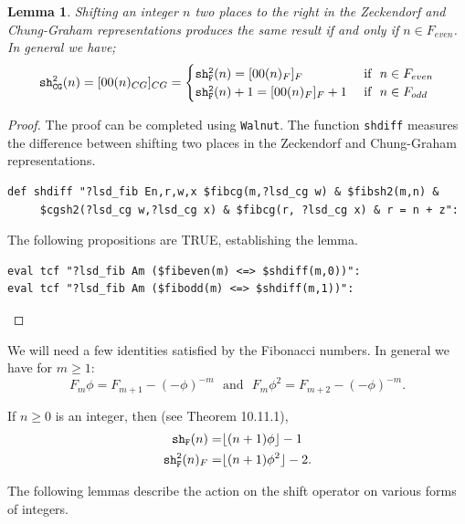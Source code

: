 \documentclass[12pt]{article}
\theoremstyle{plain}
\newtheorem{lemma}[theorem]{Lemma}
\theoremstyle{case}
\theoremstyle{definition}
\begin{document}
\begin{lemma}
\label{fibcgsh}
Shifting an integer $n$ two places to the right in the Zeckendorf and Chung-Graham representations produces the same result if and only if $n \in F_{even}$. In general we have;
\begin{equation*}
{\tt sh_{CG}^2} (n) = [00(n)_{CG}]_{CG} = 
\begin{cases}
{\tt sh_F^2} (n) = [00(n)_{F}]_{F} & \text{   if   }  \,\, n \in F_{even}\\
{\tt sh_F^2} (n)  + 1 = [00(n)_{F}]_{F} + 1  &  \text{   if   } \,\, n \in F_{odd}
\end{cases}
\end{equation*}
\end{lemma}
\begin{proof}
The proof can be completed using {\tt Walnut}. The function {\tt shdiff} measures the difference between shifting two places in the Zeckendorf and Chung-Graham representations.
\begin{verbatim}
def shdiff "?lsd_fib En,r,w,x $fibcg(m,?lsd_cg w) & $fibsh2(m,n) &
     $cgsh2(?lsd_cg w,?lsd_cg x) & $fibcg(r, ?lsd_cg x) & r = n + z":
\end{verbatim}
The following propositions are TRUE, establishing the lemma.
\begin{verbatim} 
eval tcf "?lsd_fib Am ($fibeven(m) <=> $shdiff(m,0))":
eval tcf "?lsd_fib Am ($fibodd(m) <=> $shdiff(m,1))":
\end{verbatim}
\end{proof}

\bigskip

We will need a few identities satisfied by the Fibonacci numbers. In general we have for $m \geq 1$:
\begin{equation}
\label{phif}
F_m \phi  = F_{m+1} - (-\phi)^{-m} \,\, \text{  and  } \,\, F_m \phi^2 = F_{m+2} - (-\phi)^{-m} .
\end{equation}

If $n \geq 0$ is an integer, then (see \cite{Shallit:2022} Theorem 10.11.1),
\begin{align}
\label{shift}
{\tt sh_F} (n)  =& \lfloor  (n+1) \phi \rfloor - 1 \\
{\tt sh_F^2} (n) _F =& \lfloor  (n+1) \phi^2 \rfloor - 2 . 
\end{align}

\bigskip

The following lemmas describe the action on the shift operator on various forms of integers. 
\end{document}
